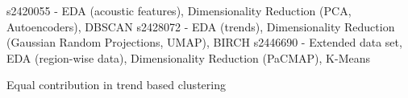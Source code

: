 s2420055 - EDA (acoustic features), Dimensionality Reduction (PCA, Autoencoders), DBSCAN
s2428072 - EDA (trends), Dimensionality Reduction (Gaussian Random Projections, UMAP), BIRCH
s2446690 - Extended data set, EDA (region-wise data), Dimensionality Reduction (PaCMAP), K-Means

Equal contribution in trend based clustering